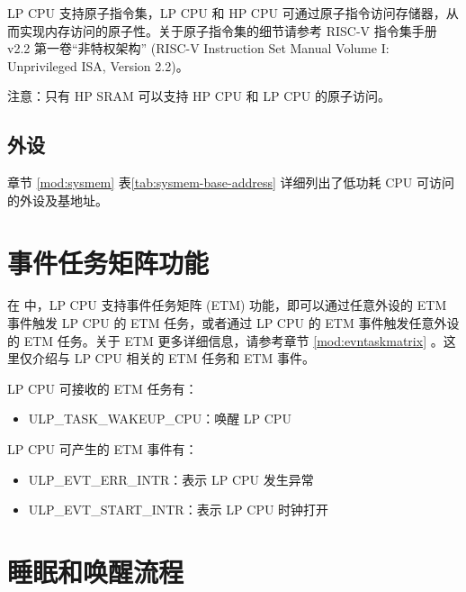 \documentclass[main\_\_CN.tex]{subfiles}
\begin{document}
LP CPU 支持原子指令集，LP CPU 和 HP CPU 可通过原子指令访问存储器，从而实现内存访问的原子性。关于原子指令集的细节请参考 RISC-V 指令集手册 v2.2 第一卷“非特权架构” (RISC-V Instruction Set Manual Volume I: Unprivileged ISA, Version 2.2)。

注意：只有 HP SRAM 可以支持 HP CPU 和 LP CPU 的原子访问。

\subsection{外设}

章节 \ref{mod:sysmem} \textit{} 表\ref{tab:sysmem-base-address} 详细列出了低功耗 CPU 可访问的外设及基地址。

\section{事件任务矩阵功能}
在 \chipname{} 中，LP CPU 支持事件任务矩阵 (ETM) 功能，即可以通过任意外设的 ETM 事件触发 LP CPU 的 ETM 任务，或者通过 LP CPU 的 ETM 事件触发任意外设的 ETM 任务。关于 ETM 更多详细信息，请参考章节 \ref{mod:evntaskmatrix} 。这里仅介绍与 LP CPU 相关的 ETM 任务和 ETM 事件。

LP CPU 可接收的 ETM 任务有：

\begin{itemize}
    \item ULP\_TASK\_WAKEUP\_CPU：唤醒 LP CPU
\end{itemize}

LP CPU 可产生的 ETM 事件有：

\begin{itemize}
    \item ULP\_EVT\_ERR\_INTR：表示 LP CPU 发生异常
    \item ULP\_EVT\_START\_INTR：表示 LP CPU 时钟打开
\end{itemize}


\section{睡眠和唤醒流程}\label{sec:sleep}
\end{document}
